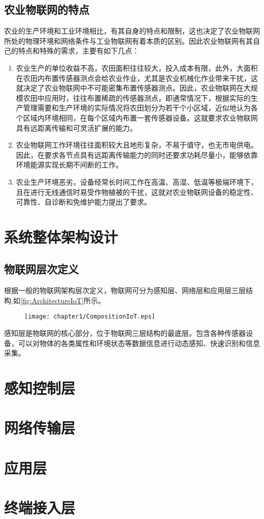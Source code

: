 	\subsection{农业物联网的特点}
	农业的生产环境和工业环境相比，有其自身的特点和限制，这也决定了农业物联网所处的物理环境和网络条件与工业物联网有着本质的区别。因此农业物联网有其自己的特点和特殊的需求，主要有如下几点：
	\begin{enumerate}
  			\item 农业生产的单位收益不高，农田面积往往较大，投入成本有限，此外，大面积在农田内布置传感器测点会给农业作业，尤其是农业机械化作业带来干扰，这就决定了农业物联网中不可能密集布置传感器测点。因此，农业物联网在大规模农田中应用时，往往布置稀疏的传感器测点，即通常情况下，根据实际的生产管理需要和生产环境的实际情况将农田划分为若干个小区域，近似地认为各个区域内环境相同，在每个区域内布置一套传感器设备。这就要求农业物联网具有远距离传输和可灵活扩展的能力。
  			\item 农业物联网工作环境往往面积较大且地形复杂，不易于值守，也无市电供电。因此，在要求各节点具有远距离传输能力的同时还要求功耗尽量小，能够依靠环境能源实现长期不间断的工作。
  			\item 农业生产环境恶劣，设备经常长时间工作在高温、高湿、低温等极端环境下，且在进行无线通信时易受作物植被的干扰，这就对农业物联网设备的稳定性、可靠性、自诊断和免维护能力提出了要求。
	\end{enumerate}

\section{系统整体架构设计}
	\subsection{物联网层次定义}
	根据一般的物联网架构层次定义\supercite{Yu2011Research,LiuQiang2010}，物联网可分为感知层、网络层和应用层三层结构,如\ref{fig:ArchitectureIoT}所示。
	\begin{figure}[!htp]
  		\centering
 		\texttt{[image: chapter1/CompositionIoT.eps]}
	\end{figure}
	感知层是物联网的核心部分，位于物联网三层结构的最底层。包含各种传感器设备，可以对物体的各类属性和环境状态等数据信息进行动态感知、快速识别和信息采集。
\section{感知控制层}

\section{网络传输层}

\section{应用层}

\section{终端接入层}
 
